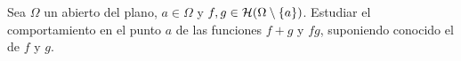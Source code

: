 \begin{ejercicio}
    Sea $\Omega$ un abierto del plano, $a \in \Omega$ y $f, g \in \mathcal{H}(\Omega \setminus \{a\})$. Estudiar el comportamiento en el punto $a$ de las funciones $f + g$ y $f g$, suponiendo conocido el de $f$ y $g$.

\begin{comment}
    Consideramos la única descomposición de $f$ y $g$ en parte regular y parte singular:
    \begin{align*}
        f(z) &= g_f(z) + h_f(z)\qquad \forall z \in \Omega \setminus \{a\}\\
        g(z) &= g_g(z) + h_g(z)\qquad \forall z \in \Omega \setminus \{a\}
    \end{align*}
    con $g_f, g_g \in \cc{H}(\Omega)$ y $h_f, h_g \in \cc{H}(\bb{C} \setminus \{a\})$ con:
    \begin{equation*}
        h_f(z) = \varphi_f\left(\dfrac{1}{z - a}\right) \qquad \forall z \in \Omega \setminus \{a\}
        \qquad
        h_g(z) = \varphi_g\left(\dfrac{1}{z - a}\right) \qquad \forall z \in \Omega \setminus \{a\}
    \end{equation*}
    donde $\varphi_f, \varphi_g \in \cc{H}(\bb{C})$ y $\varphi_f(0) = 0$, $\varphi_g(0) = 0$.\\

    Entonces, las funciones $f + g$ y $f g$ son:
    \begin{align*}
        f(z) + g(z) &= \left(g_f(z) + h_f(z)\right) + \left(g_g(z) + h_g(z)\right) = (g_f + g_g)(z) + (h_f + h_g)(z)\qquad \forall z \in \Omega \setminus \{a\}\\
        f(z) g(z) &= \left(g_f(z) + h_f(z)\right)\left(g_g(z) + h_g(z)\right) =\\&= g_f(z) g_g(z) + g_f(z) h_g(z) + g_g(z) h_f(z) + h_f(z) h_g(z)
        \qquad \forall z \in \Omega \setminus \{a\}
    \end{align*}


    Trabajamos en primer lugar con la función $f + g$. Sabemos que $g_f + g_g \in \cc{H}(\Omega)$ y $(h_f + h_g) \in \cc{H}(\bb{C} \setminus \{a\})$ con:
    \begin{equation*}
        (h_f + h_g)(z) = \varphi_f\left(\dfrac{1}{z - a}\right) + \varphi_g\left(\dfrac{1}{z - a}\right) \qquad \forall z \in \Omega \setminus \{a\}
    \end{equation*}


\end{comment}
\end{ejercicio}
